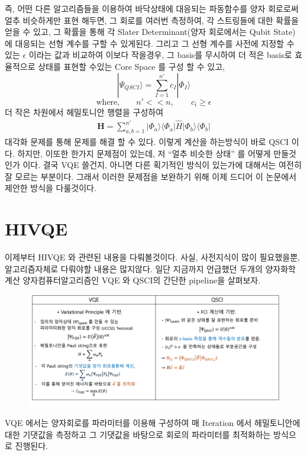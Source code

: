 \documentclass[10pt]{article}
\begin{document}
즉, 어떤 다른 알고리즘들을 이용하여 바닥상태에 대응되는 파동함수를 양자 회로로써 얼추 비슷하게만 표현 해두면, 그 회로를 여러번 측정하여, 각 스트링들에 대한 확률을 얻을 수 있고, 
그 확률을 통해 각 Slater Determinant(양자 회로에서는 Qubit State)에 대응되는 선형 계수를 구할 수 있게된다. 
그리고 그 선형 계수를 사전에 지정할 수 있는 \(\epsilon\) 이라는 값과 비교하여 이보다 작을경우, 그 basis를 무시하여 더 적은 basis로 효율적으로 상태를 표현할 수있는 Core Space 를 구성 할 수 있고, 
\[
|\Psi_{QSCI}\rangle = \sum_{I=1}^{n'} c_I |\Phi_I\rangle 
\]
\[
\text{where,} \qquad n'<<n, \qquad c_i \geq \epsilon
\]
더 작은 차원에서 헤밀토니안 행렬을 구성하여 
\begin{align*}
\mathbf{H} = \sum_{a,b=1}^{n'} \vert \Phi_a \rangle \langle \Phi_a \vert \hat{H} \vert \Phi_b \rangle \langle \Phi_b \vert
\end{align*}
대각화 문제를 통해 문제를 해결 할 수 있다. 이렇게 계산을 하는방식이 바로 QSCI 이다. 하지만, 이또한 한가지 문제점이 있는데, 
저 \enquote{얼추 비슷한 상태} 를 어떻게 만들것인가 이다. 결국 VQE 쓸건지, 아니면 다른 획기적인 방식이 있는가에 대해서는 여전히 잘 모르는 부분이다. 
그래서 이러한 문제점을 보완하기 위해 이제 드디어 이 논문에서 제안한 방식을 다룰것이다. 

\section{HIVQE}
이제부터 HIVQE 와 관련된 내용을 다뤄볼것이다. 사실, 사전지식이 많이 필요했을뿐, 알고리즘자체로 다뤄야할 내용은 많지않다. 일단 지금까지 언급했던 두개의 양자화학계산 양자컴퓨터알고리즘인 VQE 와 QSCI의 간단한 pipeline을 살펴보자. 
\begin{figure}[H]
  \centering
  \includegraphics[width=\textwidth]{fig/VQE,QSCI2.png}
  \label{fig:example2}
\end{figure}
VQE 에서는 양자회로를 파라미터를 이용해 구성하여 매 Iteration 에서 헤밀토니안에 대한 기댓값을 측정하고 그 기댓값을 바탕으로 회로의 파라미터를 최적화하는 방식으로 진행된다. 
\end{document}
